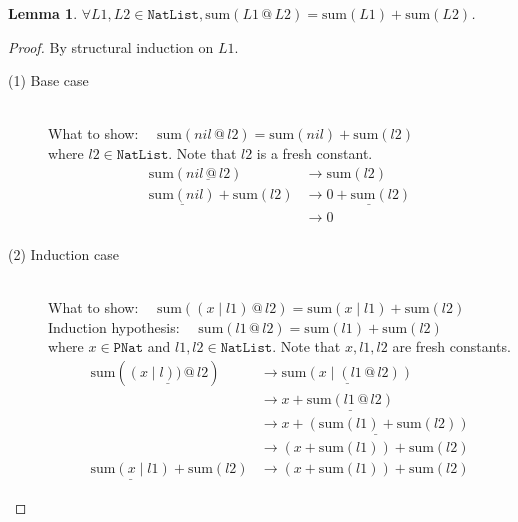 \documentclass[12pt, a4paper]{article}
\newtheorem{lemma}[theorem]{Lemma}
\newcommand{\rel}[1]{\mathrel{#1}}
\newcommand{\rmx}[1]{\mathrm{#1}}
\newcommand{\larrow}{\longrightarrow}
\newcommand{\under}{\underline}
\begin{document}
\begin{lemma}
\label{lm1}
$\forall L1, L2 \in \mathtt{NatList}, \rmx{sum}(L1 \rel{@} L2) = \rmx{sum}(L1) + \rmx{sum}(L2)$.
\end{lemma}
\begin{proof}
By structural induction on $L1$.

\begin{description}
\item[(1) Base case]~\\
\noindent
What to show: $\quad \rmx{sum}(nil \rel{@} l2) = \rmx{sum}(nil) + \rmx{sum}(l2)$ \\
where $l2 \in \mathtt{NatList}$.
Note that $l2$ is a fresh constant.
\begin{align*}
\rmx{sum}(\under{nil \rel{@} l2}) 
	&\larrow \rmx{sum}(l2)  \tag{by @1} \\
\under{\rmx{sum}(nil)} + \rmx{sum}(l2)
	&\larrow \under{0 + \rmx{sum}(l2)} \tag{by sum1} \\
	&\larrow 0 \tag{by +1} \\
\end{align*}

\item[(2) Induction case]~\\
What to show: $\quad \rmx{sum}((x \mid l1) \rel{@} l2) = \rmx{sum}(x \mid l1) + \rmx{sum}(l2)$ \\
Induction hypothesis: $\quad \rmx{sum}(l1 \rel{@} l2) = \rmx{sum}(l1) + \rmx{sum}(l2)$  \\
where $x \in \mathtt{PNat}$ and $l1, l2 \in \mathtt{NatList}$.
Note that $x, l1, l2$ are fresh constants.
\begin{align*}
\rmx{sum}(\under{(x \mid l)) \rel{@} l2})
	&\larrow \under{\rmx{sum}(x \mid (l1 \rel{@} l2))} \tag{by @2} \\
	&\larrow x + \under{\rmx{sum}(l1 \rel{@} l2)} \tag{by sum2} \\
	&\larrow \under{x + (\rmx{sum}(l1) + \rmx{sum}(l2))} \tag{by IH} \\
	&\larrow (x + \rmx{sum}(l1)) + \rmx{sum}(l2) \tag{by assoc+} \\
\under{\rmx{sum}(x \mid l1)} + \rmx{sum}(l2)
	&\larrow (x + \rmx{sum}(l1)) + \rmx{sum}(l2) \tag{by sum2}
\end{align*}
\end{description}
\end{proof}
\end{document}

